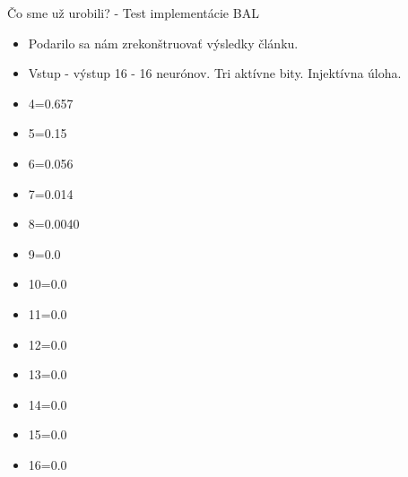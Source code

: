 \documentclass[xcolor=dvipsnames]{beamer}
\begin{document}
  
  

\begin{frame}{Čo sme už urobili? - Test implementácie BAL}
\begin{itemize}
  \item Podarilo sa nám zrekonštruovať výsledky článku.
  \item Vstup - výstup 16 - 16 neurónov. Tri aktívne bity. Injektívna úloha. 
  
  \item 4=0.657
  \item 5=0.15
  \item 6=0.056
  \item 7=0.014
  \item 8=0.0040
  \item 9=0.0
  \item 10=0.0
  \item 11=0.0
  \item 12=0.0
  \item 13=0.0
  \item 14=0.0
  \item 15=0.0
  \item 16=0.0
  \end{itemize} 
\end{frame} 
\end{document}
